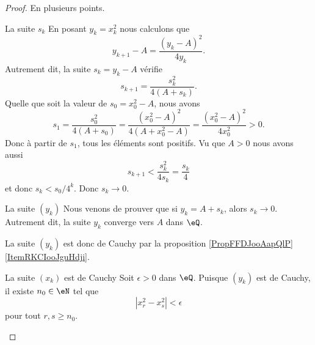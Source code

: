 \begin{proof}
    En plusieurs points.
    \begin{subproof}
        \item[La suite \( s_k\)]
            En posant \( y_k=x_k^2\) nous calculons que
            \begin{equation}
                y_{k+1}-A=\frac{ (y_k-A)^2 }{ 4y_k }.
            \end{equation}
            Autrement dit, la suite \( s_k=y_k-A\) vérifie
            \begin{equation}
                s_{k+1}=\frac{ s_k^2 }{ 4(A+s_k) }.
            \end{equation}
            Quelle que soit la valeur de \( s_0=x_0^2-A\), nous avons
            \begin{equation}
                s_1=\frac{ s_0^2 }{ 4(A+s_0) }=\frac{ (x_0^2-A)^2 }{ 4(A+x_0^2-A) }=\frac{ (x_0^2-A)^2 }{ 4x_0^2 }>0.
            \end{equation}
            Donc à partir de \( s_1\), tous les éléments sont positifs. Vu que \( A>0\) nous avons aussi
            \begin{equation}
                s_{k+1}<\frac{ s_k^2 }{ 4s_k }=\frac{ s_k }{ 4 }
            \end{equation}
            et donc \( s_k<s_0/4^k\). Donc \( s_k\to 0\).
        \item[La suite \( (y_k)\)]
            Nous venons de prouver que si \( y_k=A+s_k\), alors \( s_k\to 0\). Autrement dit, la suite \( y_k\) converge vers \( A\) dans \( \eQ\). 

            La suite \( (y_k)\) est donc de Cauchy par la proposition \ref{PropFFDJooAapQlP}\ref{ItemRKCIooJguHdji}.
        \item[La suite \( (x_k)\) est de Cauchy]
            Soit \( \epsilon>0\) dans \( \eQ\). Puisque \( (y_k)\) est de Cauchy, il existe \( n_0\in \eN\) tel que 
            \begin{equation}
                | x^2_r-x_s^2 |<\epsilon
            \end{equation}
            pour tout \( r,s\geq n_0\).


\end{subproof}
\end{proof}
